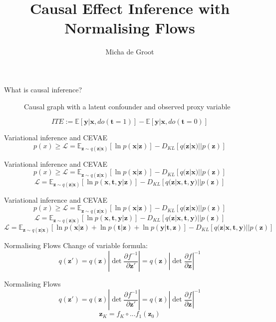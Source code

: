 \documentclass{beamer}
\title{Causal Effect Inference with Normalising Flows}
\author{Micha de Groot}
\newcommand{\E}{\mathbb{E}}
\newcommand{\bt}{\mathbf{t}}
\newcommand{\bx}{\mathbf{x}}
\newcommand{\by}{\mathbf{y}}
\newcommand{\bz}{\mathbf{z}}
\newcommand{\parfrac}[2]{\frac{\partial #1}{\partial#2}}
\begin{document}
	
	\begin{frame}
		\titlepage
	\end{frame}
	
	
	\begin{frame}{What is causal inference?} 
		\begin{figure}
            \centering
            
            \caption{Causal graph with a latent confounder and observed proxy variable}
            \label{fig:graph_observed_confounder_and_latent_with_proxy}
        \end{figure}
        $$ITE:=\E[\by|\bx, do(\bt=1)] - \E[\by|\bx, do(\bt=0)]$$
	\end{frame}
	
	\begin{frame}{Variational inference and CEVAE}
		$$p(x) \geq \mathcal{L} = \E_{\bz \sim q(\bz|\bx)}[\ln p(\bx|\bz)] - D_{KL}[q(\bz|\bx) || p(\bz)]$$
	\end{frame}
	
	\begin{frame}{Variational inference and CEVAE}
		$$p(x) \geq \mathcal{L} = \E_{\bz \sim q(\bz|\bx)}[\ln p(\bx|\bz)] - D_{KL}[q(\bz|\bx) || p(\bz)]$$
		$$ \mathcal{L} = \E_{\bz \sim q(\bz|\bx)}[\ln p(\bx, \bt, \by|\bz)] - D_{KL}[q(\bz|\bx, \bt, \by) || p(\bz)]$$
	\end{frame}
	
	\begin{frame}{Variational inference and CEVAE}
		$$p(x) \geq \mathcal{L} = \E_{\bz \sim q(\bz|\bx)}[\ln p(\bx|\bz)] - D_{KL}[q(\bz|\bx) || p(\bz)]$$
		$$ \mathcal{L} = \E_{\bz \sim q(\bz|\bx)}[\ln p(\bx, \bt, \by|\bz)] - D_{KL}[q(\bz|\bx, \bt, \by) || p(\bz)]$$
		$$ \mathcal{L} = \E_{\bz \sim q(\bz|\bx)}[\ln p(\bx|\bz) + \ln p(\bt|\bz) + \ln p(\by|\bt, \bz)] - D_{KL}[q(\bz|\bx, \bt, \by) || p(\bz)]$$
	\end{frame}
	
	\begin{frame}{Normalising Flows}
	    Change of variable formula:
	    $$q(\bz') = q(\bz)\left| \det \parfrac{f^{-1}}{\bz'} \right| = q(\bz)\left| \det \parfrac{f}{\bz} \right| ^{-1}$$
	    
	\end{frame}
	
	\begin{frame}{Normalising Flows}
	    $$q(\bz') = q(\bz)\left| \det \parfrac{f^{-1}}{\bz'} \right| = q(\bz)\left| \det \parfrac{f}{\bz} \right| ^{-1}$$
	    $$\bz_K = f_K  \circ ... f_1(\bz_0)$$
	\end{frame}
	
\end{document}
